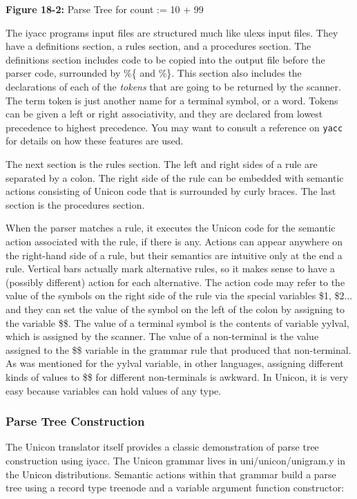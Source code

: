 {\sffamily\bfseries Figure 18-2:}
{\sffamily Parse Tree for {\textquotedbl}count := 10 + 99{\textquotedbl}}

\bigskip

The \textsf{iyacc} program{\textquotesingle}s input files are structured
much like \textsf{ulex}{\textquotesingle}s input files. They have a
definitions section, a rules section, and a procedures section. The
definitions section includes code to be copied into the output file
before the parser code, surrounded by \textsf{\%\{} and \textsf{\%\}}.
This section also includes the declarations of each of the
\textit{tokens} that are going to be returned by the scanner. The term
{\textquotedbl}token{\textquotedbl} is just another name for a terminal
symbol, or a word. Tokens can be given a left or right associativity,
and they are declared from lowest precedence to highest precedence. You
may want to consult a reference on \texttt{yacc} for details on how
these features are used.

The next section is the rules section. The left and right sides of a
rule are separated by a colon. The right side of the rule can be
embedded with semantic actions consisting of Unicon code that is
surrounded by curly braces. The last section is the procedures section.

When the parser matches a rule, it executes the Unicon code for the
semantic action associated with the rule, if there is any. Actions can
appear anywhere on the right-hand side of a rule, but their semantics
are intuitive only at the end a rule. Vertical bars actually mark
alternative rules, so it makes sense to have a (possibly different)
action for each alternative. The action code may refer to the value of
the symbols on the right side of the rule via the special variables
\textsf{\$1}, \textsf{\$2}... and they can set the value of the symbol
on the left of the colon by assigning to the variable \textsf{\$\$}.
The value of a terminal symbol is the contents of variable
\textsf{yylval}, which is assigned by the scanner. The value of a
non-terminal is the value assigned to the \textsf{\$\$} variable in the
grammar rule that produced that non-terminal. As was mentioned for the
\textsf{yylval} variable, in other languages, assigning different kinds
of values to \textsf{\$\$} for different non-terminals is awkward. In
Unicon, it is very easy because variables can hold values of any type.

\subsubsection{Parse Tree Construction}
The Unicon translator itself provides a classic demonstration of parse
tree construction using \textsf{iyacc}. The Unicon grammar lives in
\textsf{uni/unicon/unigram.y} in the Unicon distributions. Semantic
actions within that grammar build a parse tree using a record type
\textsf{treenode} and a variable argument function constructor:

